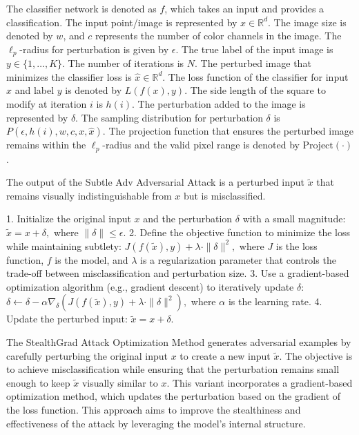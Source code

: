 The classifier network is denoted as $f$, which takes an input and provides a classification. The input point/image is represented by $x \in \mathbb{R}^d$. The image size is denoted by $w$, and $c$ represents the number of color channels in the image. The $\ell_p$-radius for perturbation is given by $\epsilon$. The true label of the input image is $y \in \{1, \ldots, K\}$. The number of iterations is $N$. The perturbed image that minimizes the classifier loss is $\hat{x} \in \mathbb{R}^d$. The loss function of the classifier for input $x$ and label $y$ is denoted by $L(f(x), y)$. The side length of the square to modify at iteration $i$ is $h(i)$. The perturbation added to the image is represented by $\delta$. The sampling distribution for perturbation $\delta$ is $P(\epsilon, h(i), w, c, x, \hat{x})$. The projection function that ensures the perturbed image remains within the $\ell_p$-radius and the valid pixel range is denoted by $\text{Project}(\cdot)$.


The output of the Subtle Adv Adversarial Attack is a perturbed input \(\tilde{x}\) that remains visually indistinguishable from \(x\) but is misclassified.

1. Initialize the original input \( x \) and the perturbation \(\delta\) with a small magnitude:
   $\tilde{x} = x + \delta,$
   where $\|\delta\| \leq \epsilon.$
2. Define the objective function to minimize the loss while maintaining subtlety:
   $J(f(\tilde{x}), y) + \lambda \cdot \|\delta\|^2,$
   where $J$ is the loss function, $f$ is the model, and $\lambda$ is a regularization parameter that controls the trade-off between misclassification and perturbation size.
3. Use a gradient-based optimization algorithm (e.g., gradient descent) to iteratively update \(\delta\):
   $\delta \leftarrow \delta - \alpha \nabla_{\delta} \left(J(f(\tilde{x}), y) + \lambda \cdot \|\delta\|^2\right),$
   where $\alpha$ is the learning rate.
4. Update the perturbed input:
   $\tilde{x} = x + \delta.$

The StealthGrad Attack Optimization Method generates adversarial examples by carefully perturbing the original input \(x\) to create a new input \(\tilde{x}\). The objective is to achieve misclassification while ensuring that the perturbation remains small enough to keep \(\tilde{x}\) visually similar to \(x\). This variant incorporates a gradient-based optimization method, which updates the perturbation based on the gradient of the loss function. This approach aims to improve the stealthiness and effectiveness of the attack by leveraging the model's internal structure.